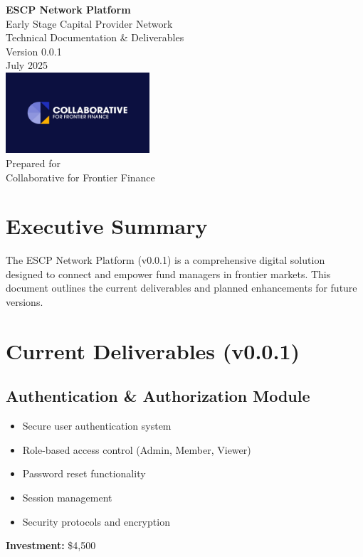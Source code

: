\documentclass[11pt,a4paper]{article}
\begin{document}
\begin{titlepage}
\begin{center}
\vspace*{2cm}
{\Huge\bfseries ESCP Network Platform\\[0.5cm]}
{\large Early Stage Capital Provider Network}\\[1cm]
{\Large Technical Documentation \& Deliverables}\\[2cm]
{\large Version 0.0.1}\\[1cm]
{\large July 2025}\\[4cm]
\includegraphics[width=0.4\textwidth]{public/logo.jpg}\\[2cm]
{\large Prepared for\\
Collaborative for Frontier Finance}
\vfill
\end{center}
\end{titlepage}

\tableofcontents
\newpage

\section{Executive Summary}
The ESCP Network Platform (v0.0.1) is a comprehensive digital solution designed to connect and empower fund managers in frontier markets. This document outlines the current deliverables and planned enhancements for future versions.

\section{Current Deliverables (v0.0.1)}

\subsection{Authentication \& Authorization Module}
\begin{tcolorbox}[colback=white,colframe=primaryBlue!20,title=Module Details]
\begin{itemize}[leftmargin=*]
    \item Secure user authentication system
    \item Role-based access control (Admin, Member, Viewer)
    \item Password reset functionality
    \item Session management
    \item Security protocols and encryption
\end{itemize}
\textbf{Investment:} \$4,500
\end{tcolorbox}
\end{document}
